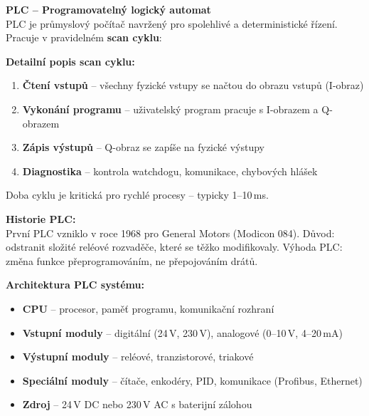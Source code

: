 \documentclass[a4paper,10pt]{article}
\begin{document}
\begin{vysvetlenibox}
\textbf{PLC -- Programovatelný logický automat}\\
PLC je průmyslový počítač navržený pro spolehlivé a deterministické řízení.
Pracuje v pravidelném \textbf{scan cyklu}:

\begin{center}
\end{center}

\textbf{Detailní popis scan cyklu:}
\begin{enumerate}[noitemsep, leftmargin=1.4em, topsep=4pt]
    \item \textbf{Čtení vstupů} -- všechny fyzické vstupy se načtou do obrazu vstupů (I-obraz)
    \item \textbf{Vykonání programu} -- uživatelský program pracuje s I-obrazem a Q-obrazem
    \item \textbf{Zápis výstupů} -- Q-obraz se zapíše na fyzické výstupy
    \item \textbf{Diagnostika} -- kontrola watchdogu, komunikace, chybových hlášek
\end{enumerate}
Doba cyklu je kritická pro rychlé procesy -- typicky 1--10\,ms.

\textbf{Historie PLC:}\\
První PLC vzniklo v roce 1968 pro General Motors (Modicon 084).
Důvod: odstranit složité reléové rozvaděče, které se těžko modifikovaly.
Výhoda PLC: změna funkce přeprogramováním, ne přepojováním drátů.

\textbf{Architektura PLC systému:}
\begin{itemize}[noitemsep, leftmargin=1.4em, topsep=4pt]
    \item \textbf{CPU} -- procesor, paměť programu, komunikační rozhraní
    \item \textbf{Vstupní moduly} -- digitální (24\,V, 230\,V), analogové (0--10\,V, 4--20\,mA)
    \item \textbf{Výstupní moduly} -- reléové, tranzistorové, triakové
    \item \textbf{Speciální moduly} -- čítače, enkodéry, PID, komunikace (Profibus, Ethernet)
    \item \textbf{Zdroj} -- 24\,V DC nebo 230\,V AC s baterijní zálohou
\end{itemize}


\end{vysvetlenibox}
\end{document}
